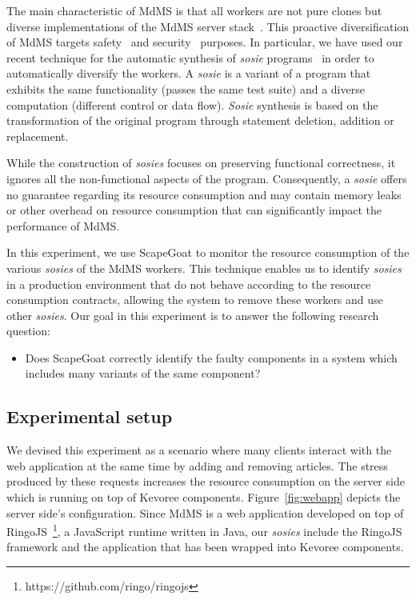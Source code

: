 The main characteristic of MdMS is that all workers are not pure clones but diverse implementations of the MdMS server stack~\cite{alliermulti}.
This proactive diversification of MdMS targets safety~\cite{avizienis85} and security~\cite{Forrest97} purposes.
In particular, we have used our recent technique for the automatic synthesis of \textit{sosie} programs~\cite{baudry2014tailored} in order to automatically diversify the workers. 
A \textit{sosie} is a variant of a program that exhibits the same functionality (passes the same test suite) and a diverse computation (different control or data flow). 
\textit{Sosie} synthesis is based on the transformation of the original program through statement deletion, addition or replacement.

While the construction of \textit{sosies} focuses on preserving functional correctness, it ignores all the non-functional aspects of the program.
Consequently, a \textit{sosie} offers no guarantee regarding its resource consumption and may contain memory leaks or other overhead on resource consumption that can significantly impact the performance of MdMS.

In this experiment, we use ScapeGoat to monitor the resource consumption of the various \textit{sosies} of the MdMS workers.
This technique enables us to identify \textit{sosies} in a production environment that do not behave according to the resource consumption contracts, allowing the system to remove these workers and use other \textit{sosies}.
Our goal in this experiment is to answer the following research question:

\begin{itemize}
 \item Does ScapeGoat correctly identify the faulty components in a system which includes many variants of the same component?   
\end{itemize}

\subsection{Experimental setup}

We devised this experiment as a scenario where many clients interact with the web application at the same time by adding and removing articles.
The stress produced by these requests increases the resource consumption on the server side which is running on top of Kevoree components.
Figure~\ref{fig:webapp} depicts the server side's configuration.
Since MdMS is a web application developed on top of RingoJS~\footnote{https://github.com/ringo/ringojs}, a JavaScript runtime written in Java, our \textit{sosies} include the RingoJS framework and the application that has been wrapped into Kevoree components.

